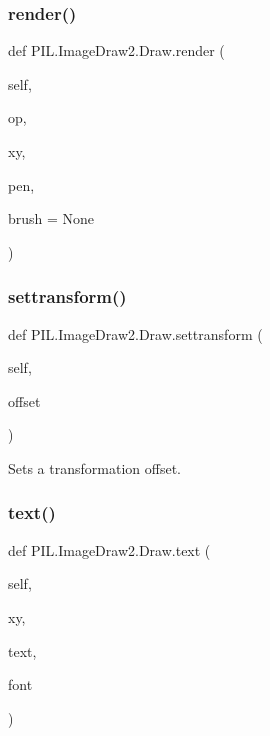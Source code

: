 \subsubsection{\texorpdfstring{render()}{render()}}
{\footnotesize\ttfamily def P\+I\+L.\+Image\+Draw2.\+Draw.\+render (\begin{DoxyParamCaption}\item[{}]{self,  }\item[{}]{op,  }\item[{}]{xy,  }\item[{}]{pen,  }\item[{}]{brush = {\ttfamily None} }\end{DoxyParamCaption})}

\mbox{\label{classPIL_1_1ImageDraw2_1_1Draw_a7dd6147e3165ff73c42733c50bd47be7}} 
\subsubsection{\texorpdfstring{settransform()}{settransform()}}
{\footnotesize\ttfamily def P\+I\+L.\+Image\+Draw2.\+Draw.\+settransform (\begin{DoxyParamCaption}\item[{}]{self,  }\item[{}]{offset }\end{DoxyParamCaption})}

\begin{DoxyVerb}Sets a transformation offset.\end{DoxyVerb}
 \mbox{\label{classPIL_1_1ImageDraw2_1_1Draw_a7a155b78e357646daa71d9ffe28eda95}} 
\subsubsection{\texorpdfstring{text()}{text()}}
{\footnotesize\ttfamily def P\+I\+L.\+Image\+Draw2.\+Draw.\+text (\begin{DoxyParamCaption}\item[{}]{self,  }\item[{}]{xy,  }\item[{}]{text,  }\item[{}]{font }\end{DoxyParamCaption})}

